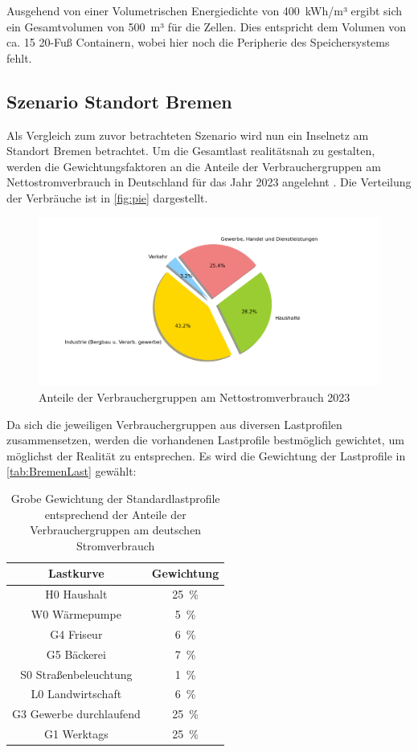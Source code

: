 Ausgehend von einer Volumetrischen Energiedichte von 400~kWh/m³ ergibt sich ein Gesamtvolumen von 500~m³ für die Zellen. Dies entspricht dem Volumen von ca. 15 20-Fuß Containern, wobei hier noch die Peripherie des Speichersystems fehlt.

\subsection{Szenario Standort Bremen}

Als Vergleich zum zuvor betrachteten Szenario wird nun ein Inselnetz am Standort Bremen betrachtet. Um die Gesamtlast realitätsnah zu gestalten, werden die Gewichtungsfaktoren an die Anteile der Verbrauchergruppen am Nettostromverbrauch in Deutschland für das Jahr 2023 angelehnt \cite{BDEW}.  Die Verteilung der Verbräuche ist in \autoref{fig:pie} dargestellt.

\begin{figure}[H]
	\centering
	\includegraphics[width=0.8\linewidth]{Abbildungen/Stromverbrauch.png}
	\caption{Anteile der Verbrauchergruppen am Nettostromverbrauch 2023 \cite{BDEW}}
	\label{fig:pie}
\end{figure}

Da sich die jeweiligen Verbrauchergruppen aus diversen Lastprofilen zusammensetzen, werden die vorhandenen Lastprofile bestmöglich gewichtet, um möglichst der Realität zu entsprechen. Es wird die Gewichtung der Lastprofile in \autoref{tab:BremenLast} gewählt:

\begin{table}
	\begin{tabular}[htpb]{c|c}
		\textbf{Lastkurve} & \textbf{Gewichtung} \\
		\hline
		H0 Haushalt & 25~\% \\
		W0 Wärmepumpe & 5~\% \\
		G4 Friseur & 6~\% \\
		G5 Bäckerei & 7~\% \\
		S0 Straßenbeleuchtung & 1~\% \\
		L0 Landwirtschaft & 6~\% \\
		G3 Gewerbe durchlaufend & 25~\% \\
		G1 Werktags & 25~\% 
	\end{tabular}
	\centering
	\caption{Grobe Gewichtung der Standardlastprofile entsprechend der Anteile der Verbrauchergruppen am deutschen Stromverbrauch}
	\label{tab:BremenLast}
\end{table}

